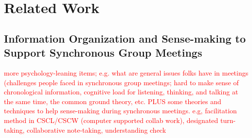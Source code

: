 \section{Related Work}
\subsection{Information Organization and Sense-making to Support Synchronous Group Meetings}

\textcolor{red}{more psychology-leaning items; e.g. what are general issues folks have in meetings (challenges people faced in synchronous group meetings; hard to make sense of chronological information, cognitive load for listening, thinking, and talking at the same time, the common ground theory, etc. PLUS some theories and techniques to help sense-making during synchronous meetings. e.g, facilitation method in CSCL/CSCW (computer supported collab work), designated turn-taking, collaborative note-taking, understanding check}


